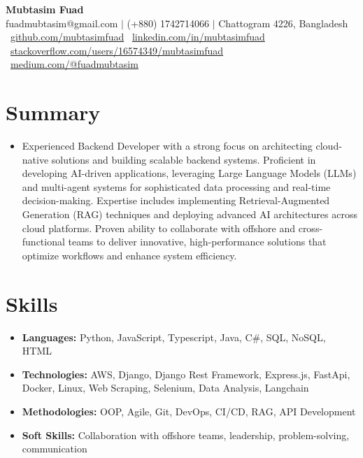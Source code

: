 \documentclass[letterpaper,10pt]{article}
\newcommand{\resumeItem}[1]{\item\small{#1 \vspace{-2pt}}}
\newcommand{\resumeSubHeadingListStart}{\begin{itemize}[leftmargin=0.15in, label={}]}
\newcommand{\resumeSubHeadingListEnd}{\end{itemize}}
\begin{document}
\begin{center}
    \textbf{\Huge Mubtasim Fuad} \\ \vspace{3pt}
    fuadmubtasim@gmail.com $|$ (+880) 1742714066 $|$ Chattogram 4226, Bangladesh \\
    \faGithub\ \href{https://github.com/mubtasimfuad}{github.com/mubtasimfuad} \hspace{10pt}
    \faLinkedinSquare\ \href{https://www.linkedin.com/in/mubtasimfuad}{linkedin.com/in/mubtasimfuad} \hspace{10pt}
    \faStackExchange\ \href{https://stackoverflow.com/users/16574349/mubtasimfuad}{stackoverflow.com/users/16574349/mubtasimfuad} \hspace{10pt}
    \faMedium\ \href{https://medium.com/@fuadmubtasim}{medium.com/@fuadmubtasim}
\end{center}

\section{Summary}
\resumeSubHeadingListStart
    \resumeItem{Experienced Backend Developer with a strong focus on architecting cloud-native solutions and building scalable backend systems. Proficient in developing AI-driven applications, leveraging Large Language Models (LLMs) and multi-agent systems for sophisticated data processing and real-time decision-making. Expertise includes implementing Retrieval-Augmented Generation (RAG) techniques and deploying advanced AI architectures across cloud platforms. Proven ability to collaborate with offshore and cross-functional teams to deliver innovative, high-performance solutions that optimize workflows and enhance system efficiency.}
\resumeSubHeadingListEnd

\section{Skills}
\resumeSubHeadingListStart
    \resumeItem{\textbf{Languages:} Python, JavaScript, Typescript, Java, C\#, SQL, NoSQL, HTML}
    \resumeItem{\textbf{Technologies:} AWS, Django, Django Rest Framework, Express.js, FastApi, Docker, Linux, Web Scraping, Selenium, Data Analysis, Langchain}
    \resumeItem{\textbf{Methodologies:} OOP, Agile, Git, DevOps, CI/CD, RAG, API Development}
    \resumeItem{\textbf{Soft Skills:} Collaboration with offshore teams, leadership, problem-solving, communication}
\resumeSubHeadingListEnd
\end{document}
